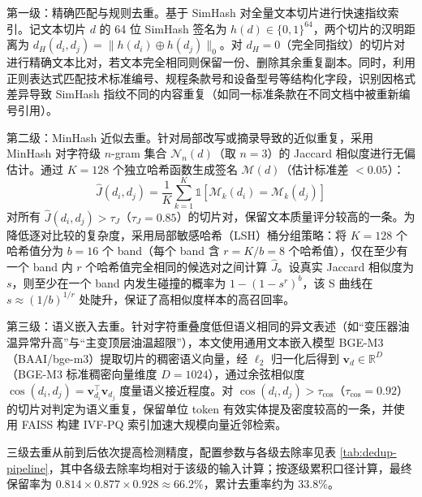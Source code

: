 \documentclass[fontset=fandol,type=master,campus=shenzhen,etitleauto=true]{hithesisbook}
\begin{document}
第一级：精确匹配与规则去重。基于 SimHash 对全量文本切片进行快速指纹索引\cite{ref59,ref60}。记文本切片 $d$ 的 64 位 SimHash 签名为 $h(d) \in \{0,1\}^{64}$，两个切片的汉明距离为 $d_H(d_i, d_j) = \|h(d_i) \oplus h(d_j)\|_0$。对 $d_H = 0$（完全同指纹）的切片对进行精确文本比对，若文本完全相同则保留一份、删除其余重复副本。同时，利用正则表达式匹配技术标准编号、规程条款号和设备型号等结构化字段，识别因格式差异导致 SimHash 指纹不同的内容重复（如同一标准条款在不同文档中被重新编号引用）。

第二级：MinHash 近似去重。针对局部改写或摘录导致的近似重复，采用 MinHash 对字符级 $n$-gram 集合 $\mathcal{N}_n(d)$（取 $n = 3$）的 Jaccard 相似度进行无偏估计\cite{ref61}。通过 $K = 128$ 个独立哈希函数生成签名 $\mathcal{M}(d)$（估计标准差 $< 0.05$）：
\begin{equation}
\hat{J}(d_i, d_j) = \frac{1}{K} \sum_{k=1}^{K} \mathbb{1}\left[\mathcal{M}_k(d_i) = \mathcal{M}_k(d_j)\right]
\end{equation}
对所有 $\hat{J}(d_i, d_j) > \tau_J$（$\tau_J = 0.85$）的切片对，保留文本质量评分较高的一条。为降低逐对比较的复杂度，采用局部敏感哈希（LSH）桶分组策略\cite{ref62}：将 $K=128$ 个哈希值分为 $b=16$ 个 band（每个 band 含 $r = K/b = 8$ 个哈希值），仅在至少有一个 band 内 $r$ 个哈希值完全相同的候选对之间计算 $\hat{J}$。设真实 Jaccard 相似度为 $s$，则至少在一个 band 内发生碰撞的概率为 $1 - (1 - s^r)^b$，该 S 曲线在 $s \approx (1/b)^{1/r}$ 处陡升，保证了高相似度样本的高召回率。

第三级：语义嵌入去重。针对字符重叠度低但语义相同的异文表述（如``变压器油温异常升高''与``主变顶层油温超限''），本文使用通用文本嵌入模型 BGE-M3（BAAI/bge-m3）提取切片的稠密语义向量，经 $\ell_2$ 归一化后得到 $\mathbf{v}_d \in \mathbb{R}^{D}$（BGE-M3 标准稠密向量维度 $D = 1024$），通过余弦相似度 $\cos(d_i, d_j) = \mathbf{v}_{d_i}^{\top} \mathbf{v}_{d_j}$ 度量语义接近程度。对 $\cos(d_i, d_j) > \tau_{\cos}$（$\tau_{\cos} = 0.92$）的切片对判定为语义重复，保留单位 token 有效实体提及密度较高的一条，并使用 FAISS 构建 IVF-PQ 索引加速大规模向量近邻检索\cite{ref63}。

三级去重从前到后依次提高检测精度，配置参数与各级去除率见表 \ref{tab:dedup-pipeline}，其中各级去除率均相对于该级的输入计算；按逐级累积口径计算，最终保留率为 $0.814 \times 0.877 \times 0.928 \approx 66.2\%$，累计去重率约为 33.8\%。
\end{document}
